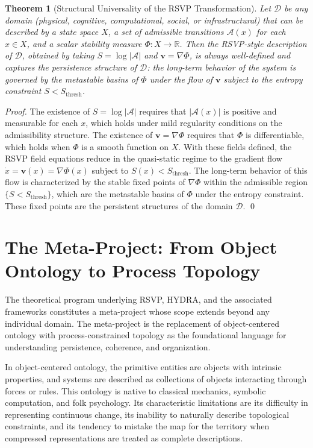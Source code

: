 \documentclass[12pt, a4paper, openany]{book}
\theoremstyle{plain}
\newtheorem{theorem}{Theorem}[chapter]
\theoremstyle{definition}
\theoremstyle{remark}
\newcommand{\vvec}{\mathbf{v}}
\newcommand{\Sfield}{S}
\newcommand{\Adm}{\mathcal{A}}
\begin{document}
\begin{theorem}[Structural Universality of the RSVP Transformation]
Let $\mathcal{D}$ be any domain (physical, cognitive, computational, social, or infrastructural) that can be described by a state space $X$, a set of admissible transitions $\Adm(x)$ for each $x \in X$, and a scalar stability measure $\Phi: X \to \mathbb{R}$. Then the RSVP-style description of $\mathcal{D}$, obtained by taking $\Sfield = \log|\Adm|$ and $\vvec = \nabla \Phi$, is always well-defined and captures the persistence structure of $\mathcal{D}$: the long-term behavior of the system is governed by the metastable basins of $\Phi$ under the flow of $\vvec$ subject to the entropy constraint $\Sfield < \Sfield_{\mathrm{thresh}}$.
\end{theorem}

\begin{proof}
The existence of $\Sfield = \log|\Adm|$ requires that $|\Adm(x)|$ is positive and measurable for each $x$, which holds under mild regularity conditions on the admissibility structure. The existence of $\vvec = \nabla \Phi$ requires that $\Phi$ is differentiable, which holds when $\Phi$ is a smooth function on $X$. With these fields defined, the RSVP field equations reduce in the quasi-static regime to the gradient flow $\dot{x} = \vvec(x) = \nabla \Phi(x)$ subject to $\Sfield(x) < \Sfield_{\mathrm{thresh}}$. The long-term behavior of this flow is characterized by the stable fixed points of $\nabla \Phi$ within the admissible region $\{\Sfield < \Sfield_{\mathrm{thresh}}\}$, which are the metastable basins of $\Phi$ under the entropy constraint. These fixed points are the persistent structures of the domain $\mathcal{D}$. \qed
\end{proof}

\section{The Meta-Project: From Object Ontology to Process Topology}

The theoretical program underlying RSVP, HYDRA, and the associated frameworks constitutes a meta-project whose scope extends beyond any individual domain. The meta-project is the replacement of object-centered ontology with process-constrained topology as the foundational language for understanding persistence, coherence, and organization.

In object-centered ontology, the primitive entities are objects with intrinsic properties, and systems are described as collections of objects interacting through forces or rules. This ontology is native to classical mechanics, symbolic computation, and folk psychology. Its characteristic limitations are its difficulty in representing continuous change, its inability to naturally describe topological constraints, and its tendency to mistake the map for the territory when compressed representations are treated as complete descriptions.
\end{document}

